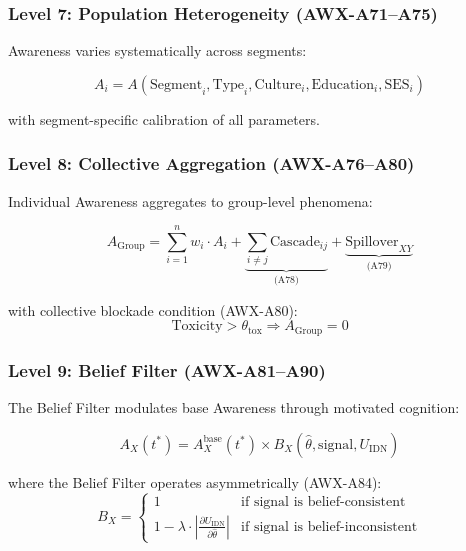 \subsubsection{Level 7: Population Heterogeneity (AWX-A71--A75)}

Awareness varies systematically across segments:

\begin{equation}
A_i = A\left(\text{Segment}_i, \text{Type}_i, \text{Culture}_i, \text{Education}_i, \text{SES}_i\right)
\label{eq:heterogeneity}
\end{equation}

with segment-specific calibration of all parameters.

\subsubsection{Level 8: Collective Aggregation (AWX-A76--A80)}

Individual Awareness aggregates to group-level phenomena:

\begin{equation}
A_{\text{Group}} = \sum_{i=1}^{n} w_i \cdot A_i + \underbrace{\sum_{i \neq j} \text{Cascade}_{ij}}_{\text{(A78)}} + \underbrace{\text{Spillover}_{XY}}_{\text{(A79)}}
\label{eq:aggregation}
\end{equation}

with collective blockade condition (AWX-A80):
\begin{equation}
\text{Toxicity} > \theta_{\text{tox}} \Rightarrow A_{\text{Group}} = 0
\end{equation}

\subsubsection{Level 9: Belief Filter (AWX-A81--A90)}

The Belief Filter modulates base Awareness through motivated cognition:

\begin{equation}
A_X(t^*) = A^{\text{base}}_X(t^*) \times B_X(\hat{\theta}, \text{signal}, U_{\text{IDN}})
\label{eq:belief-filter}
\end{equation}

where the Belief Filter operates asymmetrically (AWX-A84):
\begin{equation}
B_X = \begin{cases} 
1 & \text{if signal is belief-consistent} \\
1 - \lambda \cdot \left| \frac{\partial U_{\text{IDN}}}{\partial \hat{\theta}} \right| & \text{if signal is belief-inconsistent}
\end{cases}
\end{equation}

